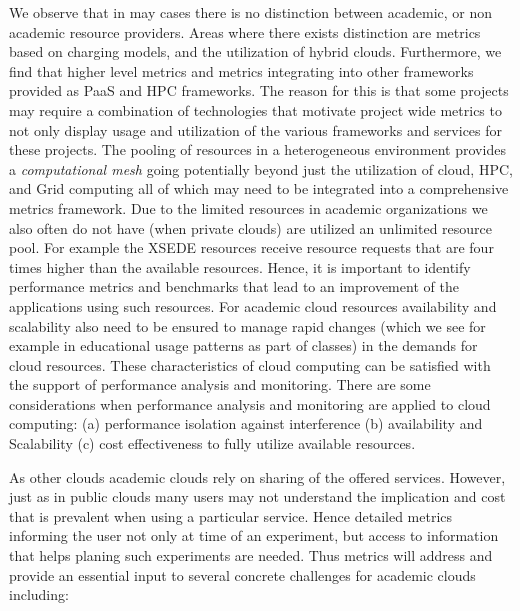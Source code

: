 \documentclass{sig-alternate-05-2015}
\begin{document}
We observe that in may cases there is no distinction between academic, or non academic resource providers. Areas where there exists distinction are metrics based on charging models, and the utilization of hybrid clouds. Furthermore, we find that higher level metrics and metrics integrating into other frameworks provided as PaaS and HPC frameworks. The reason for this is that some projects may require a combination of technologies that motivate project wide metrics to not only display usage and utilization of the various frameworks and services for these projects. The pooling of resources in a heterogeneous environment provides a {\it computational mesh} going potentially beyond just the utilization of cloud, HPC, and Grid computing all of which may need to be integrated into a comprehensive metrics framework. Due to the limited resources in academic organizations we also often do not have (when private clouds) are utilized an unlimited resource pool. For example the XSEDE resources receive resource requests that are four times higher than the available resources. Hence, it is important to identify performance metrics and benchmarks that lead to an improvement of the applications using such resources. For academic cloud resources availability and scalability also need to be ensured to manage rapid changes (which we see for example in educational usage patterns as part of classes) in the demands for cloud resources. These characteristics of cloud computing can be satisfied with the support of performance analysis and monitoring. There are some considerations when performance analysis and monitoring are applied to cloud computing: (a) performance isolation against interference (b) availability and Scalability (c) cost effectiveness to fully utilize available resources.


As other clouds academic clouds rely on sharing of the offered services. However, just as in public clouds many users may not understand the implication and cost that is prevalent when using a particular service. Hence detailed metrics informing the user not only at time of an experiment, but access to information that helps planing such experiments are needed. Thus metrics will address and provide an essential input to several concrete challenges for academic clouds including:
\end{document}
